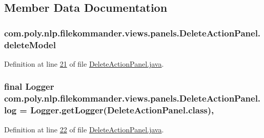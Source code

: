 \subsection{Member Data Documentation}
\hypertarget{classcom_1_1poly_1_1nlp_1_1filekommander_1_1views_1_1panels_1_1_delete_action_panel_a17228ab26020f99bdef1f28e0d525d39}{
\subsubsection[{delete\-Model}]{ com.\-poly.\-nlp.\-filekommander.\-views.\-panels.\-Delete\-Action\-Panel.\-delete\-Model\hspace{0.3cm}{\ttfamily [private]}}}\label{classcom_1_1poly_1_1nlp_1_1filekommander_1_1views_1_1panels_1_1_delete_action_panel_a17228ab26020f99bdef1f28e0d525d39}


Definition at line \hyperlink{L21}{21} of file \hyperlink{}{Delete\-Action\-Panel.\-java}.

\hypertarget{classcom_1_1poly_1_1nlp_1_1filekommander_1_1views_1_1panels_1_1_delete_action_panel_a01ad2752427baebc7718fbea69537476}{
\subsubsection[{log}]{\setlength{\rightskip}{0pt plus 5cm}final Logger com.\-poly.\-nlp.\-filekommander.\-views.\-panels.\-Delete\-Action\-Panel.\-log = Logger.\-get\-Logger(Delete\-Action\-Panel.\-class)\hspace{0.3cm}{\ttfamily [static]}, {\ttfamily [private]}}}\label{classcom_1_1poly_1_1nlp_1_1filekommander_1_1views_1_1panels_1_1_delete_action_panel_a01ad2752427baebc7718fbea69537476}


Definition at line \hyperlink{L22}{22} of file \hyperlink{}{Delete\-Action\-Panel.\-java}.

